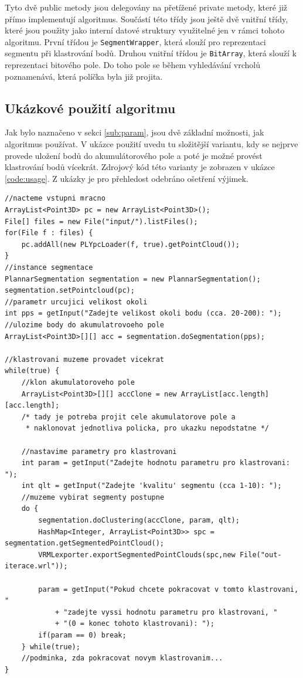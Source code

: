 \documentclass[11pt,twoside,a4paper]{book}
\begin{document}
Tyto dvě public metody jsou delegovány na přetížené private metody, které již přímo implementují algoritmus. Součástí této třídy jsou ještě dvě vnitřní třídy, které jsou použity jako interní datové struktury využitelné jen v rámci tohoto algoritmu. První třídou je \verb|SegmentWrapper|, která slouží pro reprezentaci segmentu při klastrování bodů. Druhou vnitřní třídou je \verb|BitArray|, která slouží k reprezentaci bitového pole. Do toho pole se během vyhledávání vrcholů poznamenává, která políčka byla již projita. 

\subsection{Ukázkové použití algoritmu}
\label{sub:pouziti}

Jak bylo naznačeno v sekci \ref{sub:param}, jsou dvě základní možnosti, jak algoritmus používat. V ukázce použití uvedu tu složitější variantu, kdy se nejprve provede uložení bodů do akumulátorového pole a poté je možné provést klastrování bodů vícekrát. Zdrojový kód této varianty je zobrazen v ukázce \ref{code:usage}. Z ukázky je pro přehledost odebráno ošetření výjimek.

\begin{lstlisting}[label={code:usage},caption={Ukázkové použití implementace algoritmu.}]
//nacteme vstupni mracno
ArrayList<Point3D> pc = new ArrayList<Point3D>();
File[] files = new File("input/").listFiles();
for(File f : files) {
    pc.addAll(new PLYpcLoader(f, true).getPointCloud());
}
//instance segmentace
PlannarSegmentation segmentation = new PlannarSegmentation();
segmentation.setPointcloud(pc);
//parametr urcujici velikost okoli
int pps = getInput("Zadejte velikost okoli bodu (cca. 20-200): ");
//ulozime body do akumulatrovoeho pole
ArrayList<Point3D>[][] acc = segmentation.doSegmentation(pps);

//klastrovani muzeme provadet vicekrat
while(true) {
	//klon akumulatoroveho pole
	ArrayList<Point3D>[][] accClone = new ArrayList[acc.length][acc.length];
	/* tady je potreba projit cele akumulatorove pole a 
	 * naklonovat jednotliva policka, pro ukazku nepodstatne */
	
	//nastavime parametry pro klastrovani
	int param = getInput("Zadejte hodnotu parametru pro klastrovani: ");
	int qlt = getInput("Zadejte 'kvalitu' segmentu (cca 1-10): ");  
	//muzeme vybirat segmenty postupne 
	do {
		segmentation.doClustering(accClone, param, qlt);
		HashMap<Integer, ArrayList<Point3D>> spc = segmentation.getSegmentedPointCloud();
		VRMLexporter.exportSegmentedPointClouds(spc,new File("out-iterace.wrl"));

		param = getInput("Pokud chcete pokracovat v tomto klastrovani, "
			+ "zadejte vyssi hodnotu parametru pro klastrovani, "
			+ "(0 = konec tohoto klastrovani): ");
		if(param == 0) break;
	} while(true);
	//podminka, zda pokracovat novym klastrovanim...
}
\end{lstlisting}
\end{document}
